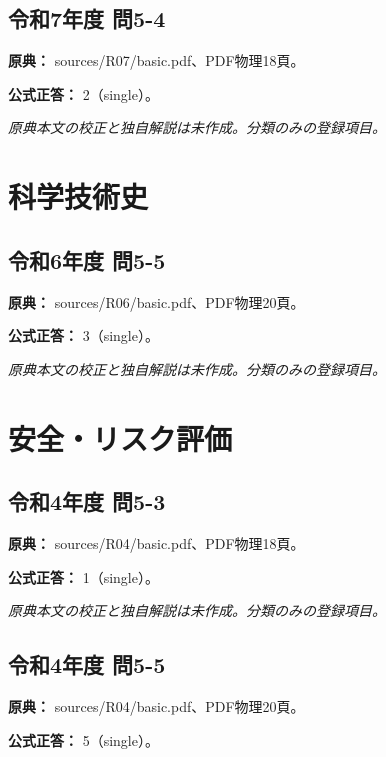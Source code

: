 \subsection{令和7年度 問5-4}
\label{q:r07-reg-basic-5-4}

\noindent\textbf{原典：} sources/R07/basic.pdf、PDF物理18頁。

\textbf{公式正答：} 2（single）。

\par\textit{原典本文の校正と独自解説は未作成。分類のみの登録項目。}

\section{科学技術史}

\subsection{令和6年度 問5-5}
\label{q:r06-reg-basic-5-5}

\noindent\textbf{原典：} sources/R06/basic.pdf、PDF物理20頁。

\textbf{公式正答：} 3（single）。

\par\textit{原典本文の校正と独自解説は未作成。分類のみの登録項目。}

\section{安全・リスク評価}

\subsection{令和4年度 問5-3}
\label{q:r04-reg-basic-5-3}

\noindent\textbf{原典：} sources/R04/basic.pdf、PDF物理18頁。

\textbf{公式正答：} 1（single）。

\par\textit{原典本文の校正と独自解説は未作成。分類のみの登録項目。}

\subsection{令和4年度 問5-5}
\label{q:r04-reg-basic-5-5}

\noindent\textbf{原典：} sources/R04/basic.pdf、PDF物理20頁。

\textbf{公式正答：} 5（single）。

